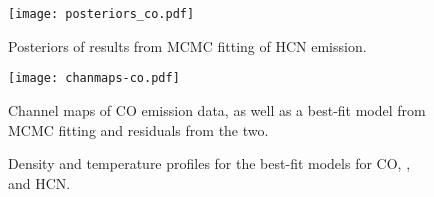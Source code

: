 
\begin{figure}[htp]
  \hspace*{\fill}%
  \texttt{[image: posteriors\_co.pdf]}\hfill%
  \hspace*{\fill}%
  \caption{Posteriors of results from MCMC fitting of HCN emission.}
  \label{fig:co_posteriors}
\end{figure}


\begin{figure}[htp]
  \hspace*{\fill}%
  \texttt{[image: chanmaps-co.pdf]}\hfill%
  \hspace*{\fill}%
  \caption{Channel maps of CO emission data, as well as a best-fit model from MCMC fitting and residuals from the two.}
  \label{fig:co_chanmaps}
\end{figure}








\begin{figure}[htp]
  \centering
    \hspace*{\fill}%
    \vfill%
    \vfill%
    \hspace*{\fill}%
    \caption{Density and temperature profiles for the best-fit models for CO, \hco, and HCN.}
    \label{fig:bf_disk_strs}
\end{figure}

